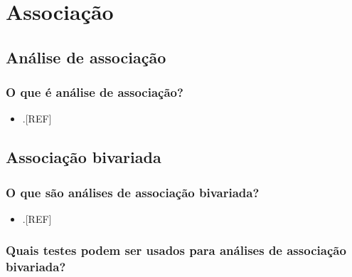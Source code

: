 \documentclass[
  a4paper,
]{book}
\providecommand{\tightlist}{%
  \setlength{\itemsep}{0pt}\setlength{\parskip}{0pt}}
\begin{document}
\hypertarget{analise-inferencial-associacao}{%
\chapter{\texorpdfstring{\textbf{Associação}}{Associação}}\label{analise-inferencial-associacao}}

\hypertarget{analise-associacao}{%
\section{Análise de associação}\label{analise-associacao}}

\hypertarget{o-que-uxe9-anuxe1lise-de-associauxe7uxe3o}{%
\subsection{O que é análise de associação?}\label{o-que-uxe9-anuxe1lise-de-associauxe7uxe3o}}

\begin{itemize}
\tightlist
\item
  .{[}REF{]}
\end{itemize}

\hypertarget{bivariada}{%
\section{Associação bivariada}\label{bivariada}}

\hypertarget{o-que-suxe3o-anuxe1lises-de-associauxe7uxe3o-bivariada}{%
\subsection{O que são análises de associação bivariada?}\label{o-que-suxe3o-anuxe1lises-de-associauxe7uxe3o-bivariada}}

\begin{itemize}
\tightlist
\item
  .{[}REF{]}
\end{itemize}

\hypertarget{quais-testes-podem-ser-usados-para-anuxe1lises-de-associauxe7uxe3o-bivariada}{%
\subsection{Quais testes podem ser usados para análises de associação bivariada?}\label{quais-testes-podem-ser-usados-para-anuxe1lises-de-associauxe7uxe3o-bivariada}}
\end{document}
